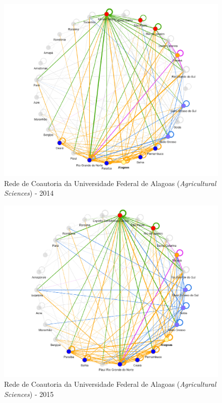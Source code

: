 \begin{figure}[H]
	\centering
	\includegraphics[scale=0.6]{Imagens/rede-agr-AL-2014.pdf}
	\caption{Rede de Coautoria da Universidade Federal de Alagoas (\textit{Agricultural Sciences}) - 2014}
	\label{Rede de Coautoria - UF AGRI AL 2014}
\end{figure}


\begin{figure}[H]
	\centering
	\includegraphics[scale=0.6]{Imagens/rede-agr-AL-2015.pdf}
	\caption{Rede de Coautoria da Universidade Federal de Alagoas (\textit{Agricultural Sciences}) - 2015}
	\label{Rede de Coautoria - UF AGRI AL 2015}
\end{figure}

